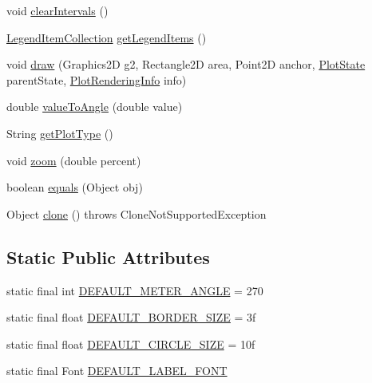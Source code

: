 \begin{DoxyCompactItemize}
\item 
void \mbox{\hyperlink{classorg_1_1jfree_1_1chart_1_1plot_1_1_meter_plot_a70717186b8caeec6c73813bd9a1a0fd2}{clear\+Intervals}} ()
\item 
\mbox{\hyperlink{classorg_1_1jfree_1_1chart_1_1_legend_item_collection}{Legend\+Item\+Collection}} \mbox{\hyperlink{classorg_1_1jfree_1_1chart_1_1plot_1_1_meter_plot_a45430436abd34bc809b0a96d01f1e213}{get\+Legend\+Items}} ()
\item 
void \mbox{\hyperlink{classorg_1_1jfree_1_1chart_1_1plot_1_1_meter_plot_ab5c4f46ac19c288a102da153e691d2f0}{draw}} (Graphics2D g2, Rectangle2D area, Point2D anchor, \mbox{\hyperlink{classorg_1_1jfree_1_1chart_1_1plot_1_1_plot_state}{Plot\+State}} parent\+State, \mbox{\hyperlink{classorg_1_1jfree_1_1chart_1_1plot_1_1_plot_rendering_info}{Plot\+Rendering\+Info}} info)
\item 
double \mbox{\hyperlink{classorg_1_1jfree_1_1chart_1_1plot_1_1_meter_plot_a3712238c445e76aa2270674abd819e3d}{value\+To\+Angle}} (double value)
\item 
String \mbox{\hyperlink{classorg_1_1jfree_1_1chart_1_1plot_1_1_meter_plot_a2f4eb60739cf1345cbdb0178b80a5504}{get\+Plot\+Type}} ()
\item 
void \mbox{\hyperlink{classorg_1_1jfree_1_1chart_1_1plot_1_1_meter_plot_a656e96cf8e085d8b6226866abc942343}{zoom}} (double percent)
\item 
boolean \mbox{\hyperlink{classorg_1_1jfree_1_1chart_1_1plot_1_1_meter_plot_aebe6822b690eb728fdce8fba69f19a2a}{equals}} (Object obj)
\item 
Object \mbox{\hyperlink{classorg_1_1jfree_1_1chart_1_1plot_1_1_meter_plot_aabc8e0f03b67fbd36a03d98cea46da40}{clone}} ()  throws Clone\+Not\+Supported\+Exception 
\end{DoxyCompactItemize}
\subsection*{Static Public Attributes}
\begin{DoxyCompactItemize}
\item 
static final int \mbox{\hyperlink{classorg_1_1jfree_1_1chart_1_1plot_1_1_meter_plot_a7507e7352ae75ea41a7bfd3407135a0b}{D\+E\+F\+A\+U\+L\+T\+\_\+\+M\+E\+T\+E\+R\+\_\+\+A\+N\+G\+LE}} = 270
\item 
static final float \mbox{\hyperlink{classorg_1_1jfree_1_1chart_1_1plot_1_1_meter_plot_ad69bf35d615a55e21b679d641987f397}{D\+E\+F\+A\+U\+L\+T\+\_\+\+B\+O\+R\+D\+E\+R\+\_\+\+S\+I\+ZE}} = 3f
\item 
static final float \mbox{\hyperlink{classorg_1_1jfree_1_1chart_1_1plot_1_1_meter_plot_a427e45ed875e4a91101a69fc74e50c02}{D\+E\+F\+A\+U\+L\+T\+\_\+\+C\+I\+R\+C\+L\+E\+\_\+\+S\+I\+ZE}} = 10f
\item 
static final Font \mbox{\hyperlink{classorg_1_1jfree_1_1chart_1_1plot_1_1_meter_plot_ad22d069276c6da6938f7d8953d4477f0}{D\+E\+F\+A\+U\+L\+T\+\_\+\+L\+A\+B\+E\+L\+\_\+\+F\+O\+NT}}
\end{DoxyCompactItemize}
